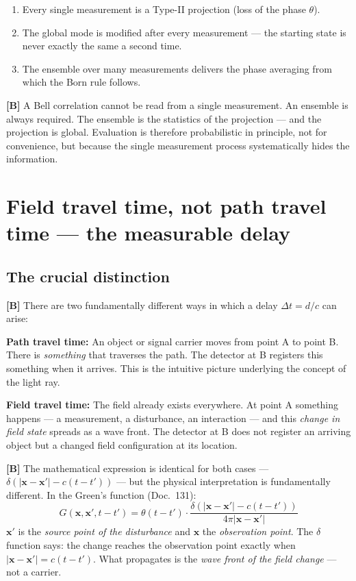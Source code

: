 \begin{enumerate}[leftmargin=1.6em,itemsep=0.3em]
  \item Every single measurement is a Type-II projection (loss of
    the phase $\theta$).
  \item The global mode is modified after every measurement ---
    the starting state is never exactly the same a second time.
  \item The ensemble over many measurements delivers the phase
    averaging from which the Born rule follows.
\end{enumerate}

\textbf{[B]} A Bell correlation cannot be read from a single measurement.
An ensemble is always required. The ensemble is the statistics of the
projection --- and the projection is global. Evaluation is therefore
probabilistic in principle, not for convenience, but because the
single measurement process systematically hides the information.

\section{Field travel time, not path travel time --- the measurable delay}

\subsection{The crucial distinction}

\textbf{[B]} There are two fundamentally different ways in which a delay
$\Delta t = d/c$ can arise:

\textbf{Path travel time:} An object or signal carrier moves from point
A to point B. There is \emph{something} that traverses the path. The
detector at B registers this something when it arrives. This is the
intuitive picture underlying the concept of the light ray.

\textbf{Field travel time:} The field already exists everywhere. At
point A something happens --- a measurement, a disturbance, an
interaction --- and this \emph{change in field state} spreads as a
wave front. The detector at B does not register an arriving object
but a changed field configuration at its location.

\textbf{[B]} The mathematical expression is identical for both cases
--- $\delta(|\mathbf{x}-\mathbf{x}'| - c(t-t'))$ --- but the physical
interpretation is fundamentally different. In the Green's function
(Doc.~131):
\[
  G(\mathbf{x},\mathbf{x}',t-t')
  = \theta(t-t') \cdot \frac{\delta(|\mathbf{x}-\mathbf{x}'| - c(t-t'))}{4\pi|\mathbf{x}-\mathbf{x}'|}
\]
$\mathbf{x}'$ is the \emph{source point of the disturbance} and
$\mathbf{x}$ the \emph{observation point}. The $\delta$ function says:
the change reaches the observation point exactly when
$|\mathbf{x}-\mathbf{x}'| = c(t-t')$. What propagates is the
\emph{wave front of the field change} --- not a carrier.

